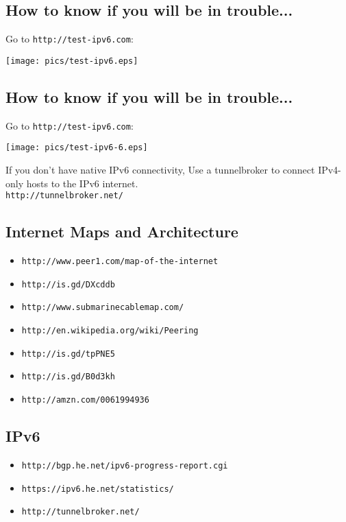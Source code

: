 \documentclass[xga]{xdvislides}
\begin{document}
\subsection{How to know if you will be in trouble...}
Go to \verb+http://test-ipv6.com+:
\begin{center}
	\texttt{[image: pics/test-ipv6.eps]}
\end{center}

\subsection{How to know if you will be in trouble...}
Go to \verb+http://test-ipv6.com+:
\begin{center}
	\texttt{[image: pics/test-ipv6-6.eps]}
\vspace{.25in}

If you don't have native IPv6 connectivity, Use a tunnelbroker to connect
IPv4-only hosts to the IPv6 internet. \\

\verb+http://tunnelbroker.net/+
\end{center}


\subsection{Internet Maps and Architecture}
\begin{itemize}
	\item \verb+http://www.peer1.com/map-of-the-internet+
	\item \verb+http://is.gd/DXcddb+
	\item \verb+http://www.submarinecablemap.com/+
	\item \verb+http://en.wikipedia.org/wiki/Peering+
	\item \verb+http://is.gd/tpPNE5+
	\item \verb+http://is.gd/B0d3kh+
	\item \verb+http://amzn.com/0061994936+
\end{itemize}

\subsection{IPv6}
\begin{itemize}
	\item \verb+http://bgp.he.net/ipv6-progress-report.cgi+
	\item \verb+https://ipv6.he.net/statistics/+
	\item \verb+http://tunnelbroker.net/+
\end{itemize}
\end{document}
